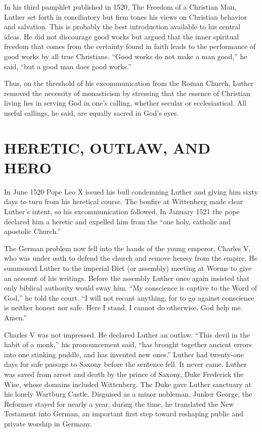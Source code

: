 In his third pamphlet published in 1520, The Freedom of a Christian Man, Luther set forth in
conciliatory but firm tones his views on Christian behavior and salvation. This is probably the best
introduction available to his central ideas. He did not discourage good works but argued that the
inner spiritual freedom that comes from the certainty found in faith leads to the performance of
good works by all true Christians. “Good works do not make a man good,” he said, “but a good man
does good works.”

Thus, on the threshold of his excommunication from the Roman Church, Luther removed the necessity of
monasticism by stressing that the essence of Christian living lies in serving God in one’s calling,
whether secular or ecclesiastical. All useful callings, he said, are equally sacred in God’s eyes.

\section{HERETIC, OUTLAW, AND HERO}

In June 1520 Pope Leo X issued his bull condemning Luther and giving him sixty days to turn from his
heretical course. The bonfire at Wittenberg made clear Luther’s intent, so his excommunication
followed. In January 1521 the pope declared him a heretic and expelled him from the “one holy,
catholic and apostolic Church.”

The German problem now fell into the hands of the young emperor, Charles V, who was under oath to
defend the church and remove heresy from the empire. He summoned Luther to the imperial Diet (or
assembly) meeting at Worms to give an account of his writings. Before the assembly Luther once again
insisted that only biblical authority would sway him. “My conscience is captive to the Word of God,”
he told the court. “I will not recant anything, for to go against conscience is neither honest nor
safe. Here I stand, I cannot do otherwise. God help me. Amen.”

Charles V was not impressed. He declared Luther an outlaw. “This devil in the habit of a monk,” his
pronouncement said, “has brought together ancient errors into one stinking puddle, and has invented
new ones.” Luther had twenty-one days for safe passage to Saxony before the sentence fell. It never
came. Luther was saved from arrest and death by the prince of Saxony, Duke Frederick the Wise, whose
domains included Wittenberg. The Duke gave Luther sanctuary at his lonely Wartburg Castle. Disguised
as a minor nobleman, Junker George, the Reformer stayed for nearly a year; during the time, he
translated the New Testament into German, an important first step toward reshaping public and
private worship in Germany.

